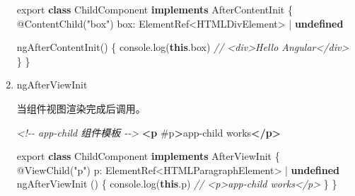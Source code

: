 \documentclass[
]{article}
\newenvironment{Shaded}{}{}
\newcommand{\AttributeTok}[1]{\textcolor[rgb]{0.49,0.56,0.16}{#1}}
\newcommand{\BuiltInTok}[1]{#1}
\newcommand{\CommentTok}[1]{\textcolor[rgb]{0.38,0.63,0.69}{\textit{#1}}}
\newcommand{\DataTypeTok}[1]{\textcolor[rgb]{0.56,0.13,0.00}{#1}}
\newcommand{\FunctionTok}[1]{\textcolor[rgb]{0.02,0.16,0.49}{#1}}
\newcommand{\ImportTok}[1]{#1}
\newcommand{\KeywordTok}[1]{\textcolor[rgb]{0.00,0.44,0.13}{\textbf{#1}}}
\newcommand{\NormalTok}[1]{#1}
\newcommand{\OperatorTok}[1]{\textcolor[rgb]{0.40,0.40,0.40}{#1}}
\newcommand{\OtherTok}[1]{\textcolor[rgb]{0.00,0.44,0.13}{#1}}
\newcommand{\StringTok}[1]{\textcolor[rgb]{0.25,0.44,0.63}{#1}}
\begin{document}
\begin{enumerate}
\begin{Shaded}
\begin{Highlighting}[]
\ImportTok{export} \KeywordTok{class}\NormalTok{ ChildComponent }\KeywordTok{implements}\NormalTok{ AfterContentInit \{}
\NormalTok{  @}\FunctionTok{ContentChild}\NormalTok{(}\StringTok{"box"}\NormalTok{) }\DataTypeTok{box}\OperatorTok{:}\NormalTok{ ElementRef}\OperatorTok{\textless{}}\BuiltInTok{HTMLDivElement}\OperatorTok{\textgreater{}} \OperatorTok{|} \KeywordTok{undefined}

  \FunctionTok{ngAfterContentInit}\NormalTok{() \{}
    \BuiltInTok{console}\OperatorTok{.}\FunctionTok{log}\NormalTok{(}\KeywordTok{this}\OperatorTok{.}\AttributeTok{box}\NormalTok{) }\CommentTok{// \textless{}div\textgreater{}Hello Angular\textless{}/div\textgreater{}}
\NormalTok{  \}}
\NormalTok{\}}
\end{Highlighting}
\end{Shaded}
\item
  ngAfterViewInit

  当组件视图渲染完成后调用。

\begin{Shaded}
\begin{Highlighting}[]
\CommentTok{\textless{}!{-}{-} app{-}child 组件模板 {-}{-}\textgreater{}}
\KeywordTok{\textless{}p}\OtherTok{ \#p}\KeywordTok{\textgreater{}}\NormalTok{app{-}child works}\KeywordTok{\textless{}/p\textgreater{}}
\end{Highlighting}
\end{Shaded}

\begin{Shaded}
\begin{Highlighting}[]
\ImportTok{export} \KeywordTok{class}\NormalTok{ ChildComponent }\KeywordTok{implements}\NormalTok{ AfterViewInit \{}
\NormalTok{  @}\FunctionTok{ViewChild}\NormalTok{(}\StringTok{"p"}\NormalTok{) }\DataTypeTok{p}\OperatorTok{:}\NormalTok{ ElementRef}\OperatorTok{\textless{}}\BuiltInTok{HTMLParagraphElement}\OperatorTok{\textgreater{}} \OperatorTok{|} \KeywordTok{undefined}
  \FunctionTok{ngAfterViewInit}\NormalTok{ () \{}
    \BuiltInTok{console}\OperatorTok{.}\FunctionTok{log}\NormalTok{(}\KeywordTok{this}\OperatorTok{.}\AttributeTok{p}\NormalTok{) }\CommentTok{// \textless{}p\textgreater{}app{-}child works\textless{}/p\textgreater{}}
\NormalTok{  \}}
\NormalTok{\}}
\end{Highlighting}
\end{Shaded}
\end{enumerate}
\end{document}
